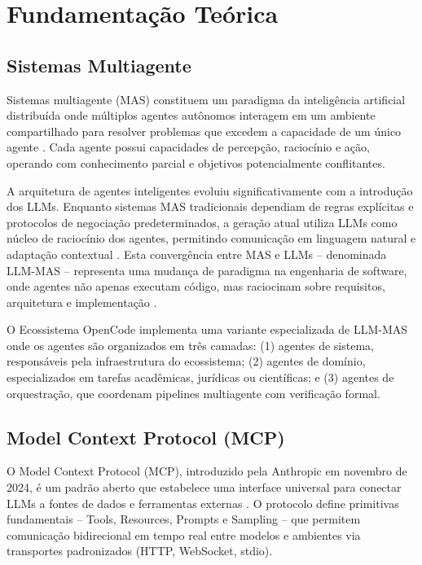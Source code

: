 \documentclass[12pt,a4paper,sumario=tradicional]{abntex2}
\begin{document}
\chapter{Fundamentação Teórica}

\section{Sistemas Multiagente}

Sistemas multiagente (MAS) constituem um paradigma da inteligência artificial distribuída onde múltiplos agentes autônomos interagem em um ambiente compartilhado para resolver problemas que excedem a capacidade de um único agente \cite{wooldridge2009mas}. Cada agente possui capacidades de percepção, raciocínio e ação, operando com conhecimento parcial e objetivos potencialmente conflitantes.

A arquitetura de agentes inteligentes evoluiu significativamente com a introdução dos LLMs. Enquanto sistemas MAS tradicionais dependiam de regras explícitas e protocolos de negociação predeterminados, a geração atual utiliza LLMs como núcleo de raciocínio dos agentes, permitindo comunicação em linguagem natural e adaptação contextual \cite{rasheed2026llm}. Esta convergência entre MAS e LLMs -- denominada LLM-MAS -- representa uma mudança de paradigma na engenharia de software, onde agentes não apenas executam código, mas raciocinam sobre requisitos, arquitetura e implementação \cite{rangel2026codeair}.

O Ecossistema OpenCode implementa uma variante especializada de LLM-MAS onde os agentes são organizados em três camadas: (1) agentes de sistema, responsáveis pela infraestrutura do ecossistema; (2) agentes de domínio, especializados em tarefas acadêmicas, jurídicas ou científicas; e (3) agentes de orquestração, que coordenam pipelines multiagente com verificação formal.

\section{Model Context Protocol (MCP)}

O Model Context Protocol (MCP), introduzido pela Anthropic em novembro de 2024, é um padrão aberto que estabelece uma interface universal para conectar LLMs a fontes de dados e ferramentas externas \cite{ayyagari2025mcp}. O protocolo define primitivas fundamentais -- Tools, Resources, Prompts e Sampling -- que permitem comunicação bidirecional em tempo real entre modelos e ambientes via transportes padronizados (HTTP, WebSocket, stdio).
\end{document}
